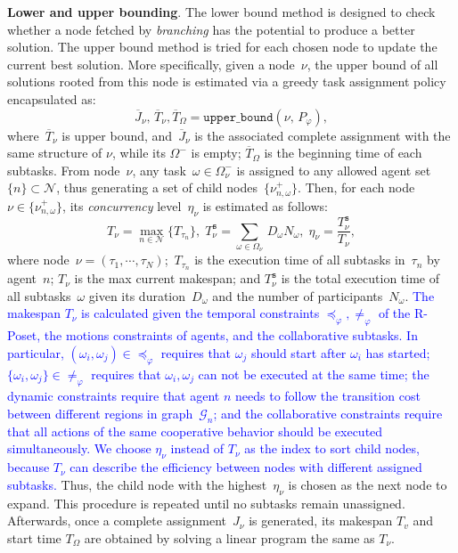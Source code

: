 \textbf{Lower and upper bounding}.
The lower bound method is designed to check whether a node fetched by \emph{branching}
has the potential to produce a better solution.
The upper bound method is tried for each chosen node to update
 the current best solution.
More specifically, given a node~$\nu$,
the upper bound of all solutions rooted from this node
is estimated via a greedy task assignment policy encapsulated as:
\begin{equation}\label{eq:upper-bound}
\overline{J}_\nu,\, \overline{T}_\nu ,\overline{T}_\Omega= \texttt{upper\_bound}(\nu,\, P_{\varphi}),
\end{equation}
{where~$\overline{T}_\nu$ is upper bound, and~$\overline{J}_\nu$ is the
associated complete assignment with the same structure of $\nu$, while its $\Omega^-$ is empty; $\overline{T}_\Omega$ is the beginning time
of each subtasks.}
From node~$\nu$, any task~$\omega\in \Omega^-_\nu$ is assigned
to any allowed agent set~$\{n\}\subset\mathcal{N}$,
thus generating a set of child nodes~$\{\nu^+_{n,\omega}\}$.
Then, for each node~$\nu\in \{\nu^+_{n,\omega}\}$,
its \emph{concurrency} level~$\eta_{\nu}$ is estimated as follows:
\begin{equation}\label{eq:node-makespan}
T_\nu = \max_{n\in\mathcal{N}} \{T_{\tau_n}\},\;
T^{\texttt{s}}_\nu = \sum_{\omega\in\Omega_\nu}\, D_{\omega}N_\omega,\;
\eta_\nu = \frac{T^{\texttt{s}}_\nu}{T_\nu},
\end{equation}
where node~$\nu=(\tau_1,\cdots,\tau_N)$;~$T_{\tau_n}$ is the execution
time of all subtasks in~$\tau_n$ by agent~$n$;
$T_\nu$ is the max current makespan; 
and $T^{\texttt{s}}_\nu$ is the total execution time of all subtasks~$\omega$
given its duration~$D_\omega$ and the number of participants~$N_\omega$.
\textcolor{blue}{The makespan $T_\nu$ is calculated given
  the temporal constraints $\preceq_{\varphi},\neq_{\varphi}$ of the R-Poset,
  the motions constraints of agents, and the collaborative subtasks.
  In particular, $(\omega_i,\omega_j)\in\preceq_\varphi$ requires that $\omega_j$ should start 
after $\omega_i$ has started; $\{\omega_i,\omega_j\}\in\neq_\varphi$
requires that $\omega_i, \omega_j$ can not be executed at the same time;
the dynamic constraints require that agent $n$ needs to follow the transition
cost between different regions in graph~$\mathcal{G}_n$; 
and the collaborative constraints require that all actions of 
the same cooperative behavior should be executed simultaneously. We choose $\eta_\nu$ instead of $T_\nu$ as the index to 
sort child nodes, because $T_\nu$ can describe the efficiency between
nodes with different assigned subtasks.}
Thus, the child node with the highest~$\eta_{\nu}$ is chosen as
the next node to expand.
This procedure is repeated until no subtasks remain unassigned.
Afterwards, once a complete assignment~$J_\nu$ is generated, 
its makespan $T_v$ and start time $T_\Omega$ are obtained by
solving a linear program the same as $T_\nu$.


